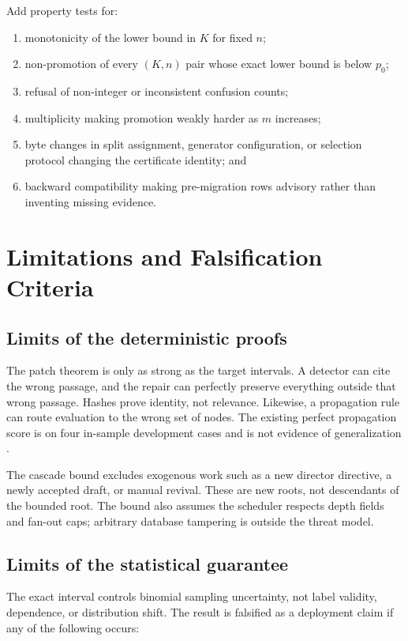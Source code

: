 \documentclass[11pt]{article}
\begin{document}
Add property tests for:

\begin{enumerate}
  \item monotonicity of the lower bound in $K$ for fixed $n$;
  \item non-promotion of every $(K,n)$ pair whose exact lower bound is below $p_0$;
  \item refusal of non-integer or inconsistent confusion counts;
  \item multiplicity making promotion weakly harder as $m$ increases;
  \item byte changes in split assignment, generator configuration, or selection protocol
  changing the certificate identity; and
  \item backward compatibility making pre-migration rows advisory rather than inventing
  missing evidence.
\end{enumerate}

\section{Limitations and Falsification Criteria}

\subsection{Limits of the deterministic proofs}

The patch theorem is only as strong as the target intervals. A detector can cite the wrong
passage, and the repair can perfectly preserve everything outside that wrong passage. Hashes
prove identity, not relevance. Likewise, a propagation rule can route evaluation to the wrong
set of nodes. The existing perfect propagation score is on four in-sample development cases
and is not evidence of generalization \cite{litharnessbrief}.

The cascade bound excludes exogenous work such as a new director directive, a newly accepted
draft, or manual revival. These are new roots, not descendants of the bounded root. The bound
also assumes the scheduler respects depth fields and fan-out caps; arbitrary database
tampering is outside the threat model.

\subsection{Limits of the statistical guarantee}

The exact interval controls binomial sampling uncertainty, not label validity, dependence,
or distribution shift. The result is falsified as a deployment claim if any of the following
occurs:
\end{document}
